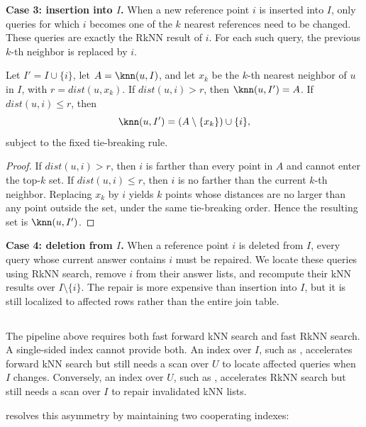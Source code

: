 \noindent\textbf{Case 3: insertion into $I$.}
When a new reference point $i$ is inserted into $I$, only queries for which $i$ becomes one of the $k$ nearest references need to be changed. These queries are exactly the RkNN result of $i$. For each such query, the previous $k$-th neighbor is replaced by $i$.

\begin{lemma}
\label{lm:insertquery}
Let $I'=I\cup\{i\}$, let $A=\knn(u,I)$, and let $x_k$ be the $k$-th nearest neighbor of $u$ in $I$, with $r=dist(u,x_k)$. If $dist(u,i)>r$, then $\knn(u,I')=A$. If $dist(u,i)\le r$, then
\[
\knn(u,I')=(A\setminus\{x_k\})\cup\{i\},
\]
subject to the fixed tie-breaking rule.
\end{lemma}

\begin{proof}
If $dist(u,i)>r$, then $i$ is farther than every point in $A$ and cannot enter the top-$k$ set. If $dist(u,i)\le r$, then $i$ is no farther than the current $k$-th neighbor. Replacing $x_k$ by $i$ yields $k$ points whose distances are no larger than any point outside the set, under the same tie-breaking order. Hence the resulting set is $\knn(u,I')$.
\end{proof}

\noindent\textbf{Case 4: deletion from $I$.}
When a reference point $i$ is deleted from $I$, every query whose current answer contains $i$ must be repaired. We locate these queries using RkNN search, remove $i$ from their answer lists, and recompute their kNN results over $I\setminus\{i\}$. The repair is more expensive than insertion into $I$, but it is still localized to affected rows rather than the entire join table.

\subsection{\dualtree}
\label{subsec:dualtree}

The pipeline above requires both fast forward kNN search and fast RkNN search. A single-sided index cannot provide both. An index over $I$, such as \deltatree, accelerates forward kNN search but still needs a scan over $U$ to locate affected queries when $I$ changes. Conversely, an index over $U$, such as \hdrtree, accelerates RkNN search but still needs a scan over $I$ to repair invalidated kNN lists.

\dualtree resolves this asymmetry by maintaining two cooperating indexes:

